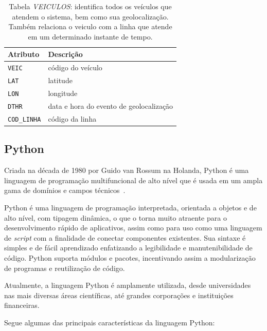 \begin{table}[htb]
    \caption{Tabela \emph{VEICULOS}: identifica todos os veículos que atendem o sistema, bem como sua geolocalização. Também relaciona o veiculo com a linha que atende em um determinado instante de tempo.}
    \centering
    \begin{tabular}{ p{5cm}p{9cm}} 
        \hline
        Atributo & Descrição\\
        \hline
        \texttt{VEIC} & código do veículo \\
        \texttt{LAT} & latitude \\
        \texttt{LON} & longitude  \\
        \texttt{DTHR} & data e hora do evento de geolocalização \\
        \texttt{COD\_LINHA} & código da linha \\
        \hline  
    \end{tabular}
    \label{tab:veiculos}
\end{table}

\subsection{Python}


Criada na década de 1980 por Guido van Rossum na Holanda, Python é uma linguagem de programação multifuncional de alto nível que é usada em um ampla gama de domínios e campos técnicos~\cite{Yves:2018}.

Python é uma linguagem de programação interpretada, orientada a objetos e de alto nível, com tipagem dinâmica, o que o torna muito atraente para o desenvolvimento rápido de aplicativos, assim como para uso como uma linguagem de \emph{script} com a finalidade de conectar componentes existentes.
Sua sintaxe é simples e de fácil aprendizado enfatizando a legibilidade e manutenibilidade de código. Python suporta módulos e pacotes, incentivando assim a modularização de programas e reutilização de código.
 
Atualmente, a linguagem Python é amplamente utilizada, desde universidades nas mais diversas áreas científicas, até grandes corporações e instituições financeiras.

Segue algumas das principais características da linguagem Python:

